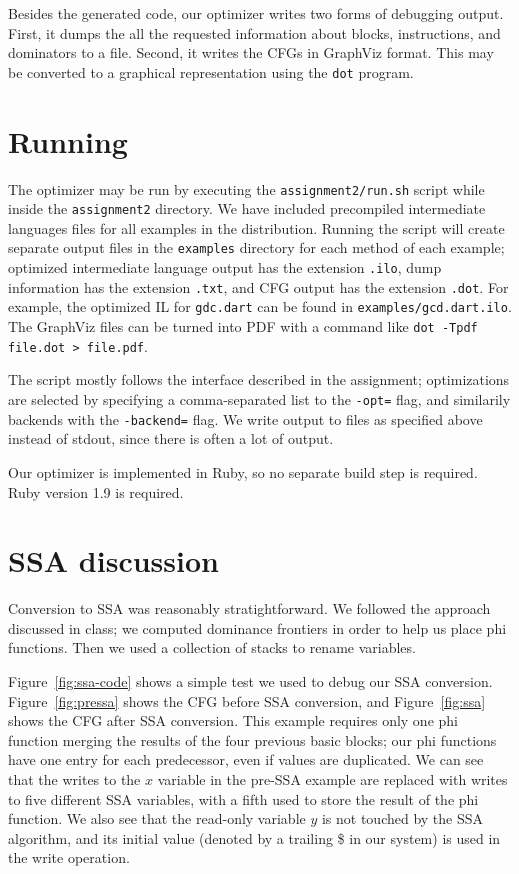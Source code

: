 \documentclass[10pt,twocolumn]{article}
\begin{document}
Besides the generated code, our optimizer writes two forms of
debugging output. First, it dumps the all the requested information
about blocks, instructions, and dominators to a file. Second, it
writes the CFGs in GraphViz format. This may be converted to a
graphical representation using the \texttt{dot} program.

\section{Running}

The optimizer may be run by executing the \texttt{assignment2/run.sh}
script while inside the \texttt{assignment2} directory. We have
included precompiled intermediate languages files for all examples in
the distribution. Running the script will create separate output files
in the \texttt{examples} directory for each method of each example;
optimized intermediate language output has the extension
\texttt{.ilo}, dump information has the extension \texttt{.txt}, and
CFG output has the extension \texttt{.dot}. For example, the optimized
IL for \texttt{gdc.dart} can be found in
\texttt{examples/gcd.dart.ilo}. The GraphViz files can be turned into
PDF with a command like \texttt{dot -Tpdf file.dot > file.pdf}.

The script mostly follows the interface described in the assignment;
optimizations are selected by specifying a comma-separated list to the
\texttt{-opt=} flag, and similarily backends with the
\texttt{-backend=} flag. We write output to files as specified above
instead of stdout, since there is often a lot of output.

Our optimizer is implemented in Ruby, so no separate build step is
required. Ruby version 1.9 is required. 

\section{SSA discussion}

Conversion to SSA was reasonably stratightforward. We followed the
approach discussed in class; we computed dominance frontiers in order
to help us place phi functions. Then we used a collection of stacks to
rename variables.

Figure~\ref{fig:ssa-code} shows a simple test we used to debug our SSA
conversion. Figure~\ref{fig:pressa} shows the CFG before SSA
conversion, and Figure~\ref{fig:ssa} shows the CFG after SSA
conversion. This example requires only one phi function merging the
results of the four previous basic blocks; our phi functions have one
entry for each predecessor, even if values are duplicated. We can see
that the writes to the $x$ variable in the pre-SSA example are
replaced with writes to five different SSA variables, with a fifth
used to store the result of the phi function. We also see that the
read-only variable $y$ is not touched by the SSA algorithm, and its
initial value (denoted by a trailing \$ in our system) is used in the
write operation.
\end{document}
